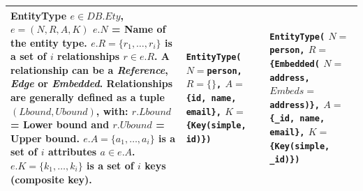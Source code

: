 \begin{longtable}{@{} >{\raggedright}p{5.0cm}
                        >{\raggedright}p{4.0cm}
                        >{\raggedright\arraybackslash}p{4.0cm} @{}}
  \textbf{EntityType}\newline
  $e \in DB.Ety$, $e = (N, R, A, K)$\newline
  $e.N$ = Name of the entity type.\newline
  $e.R = \{r_1, \ldots, r_i\}$ is a set of $i$\newline
  \quad relationships $r \in e.R$. A\newline
  \quad relationship can be a\newline
  \quad \textit{Reference}, \textit{Edge} or\newline
  \quad \textit{Embedded}. Relationships\newline
  \quad are generally defined as a\newline
  \quad tuple $(Lbound, Ubound)$, with:\newline
  \quad $r.Lbound$ = Lower bound and\newline
  \quad $r.Ubound$ = Upper bound.\newline
  $e.A = \{a_1, \ldots, a_i\}$ is a set of $i$\newline
  \quad attributes $a \in e.A$.\newline
  $e.K = \{k_1, \ldots, k_i\}$ is a set of $i$\newline
  \quad keys (composite key).
  &
  \texttt{EntityType(}\newline
  \quad $N{=}$\texttt{person,}\newline
  \quad $R{=}\{\}$\texttt{,}\newline
  \quad $A{=}$\texttt{\{id, name,}\newline
  \quad\quad\texttt{email\},}\newline
  \quad $K{=}$\texttt{\{Key(simple,}\newline
  \quad\quad\texttt{id)\})}
  &
  \texttt{EntityType(}\newline
  \quad $N{=}$\texttt{person,}\newline
  \quad $R{=}$\texttt{\{Embedded(}\newline
  \quad\quad $N{=}$\texttt{address,}\newline
  \quad\quad $Embeds{=}$\texttt{address)\},}\newline
  \quad $A{=}$\texttt{\{\_id, name,}\newline
  \quad\quad\texttt{email\},}\newline
  \quad $K{=}$\texttt{\{Key(simple,}\newline
  \quad\quad\texttt{\_id)\})}
  \\
  \midrule


\end{longtable}
